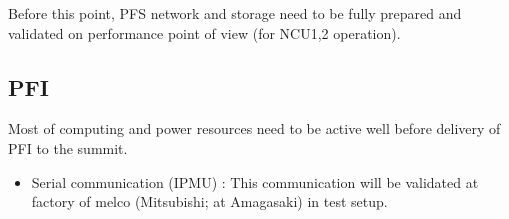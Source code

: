 \documentclass[a4paper,notitlepage]{article}
\begin{document}
Before this point, PFS network and storage need to be fully prepared and 
validated on performance point of view (for NCU1,2 operation).


\subsection{PFI}

Most of computing and power resources need to be active well before delivery 
of PFI to the summit.

\begin{itemize}
  \item Serial communication (IPMU)
    : This communication will be validated at factory of melco 
      (Mitsubishi; at Amagasaki) in test setup.
\end{itemize}
\end{document}
